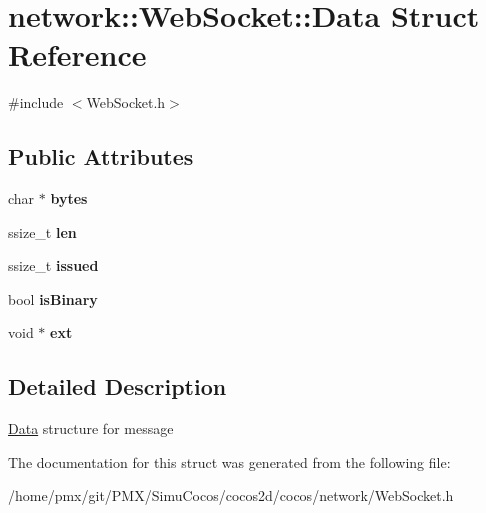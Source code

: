 \hypertarget{structnetwork_1_1WebSocket_1_1Data}{}\section{network\+:\+:Web\+Socket\+:\+:Data Struct Reference}
\label{structnetwork_1_1WebSocket_1_1Data}


{\ttfamily \#include $<$Web\+Socket.\+h$>$}

\subsection*{Public Attributes}
\begin{DoxyCompactItemize}
\item 
\mbox{\label{structnetwork_1_1WebSocket_1_1Data_af8961e019ff6d571ffb5baf07011db6d}} 
char $\ast$ {\bfseries bytes}
\item 
\mbox{\label{structnetwork_1_1WebSocket_1_1Data_a1215b287b0a3c15d0214e24abb21fb03}} 
ssize\+\_\+t {\bfseries len}
\item 
\mbox{\label{structnetwork_1_1WebSocket_1_1Data_a14a32388be0fc872bacf126a3f3e43dc}} 
ssize\+\_\+t {\bfseries issued}
\item 
\mbox{\label{structnetwork_1_1WebSocket_1_1Data_a1b65e741f92311a4a1f4cad3e8eb924b}} 
bool {\bfseries is\+Binary}
\item 
\mbox{\label{structnetwork_1_1WebSocket_1_1Data_ae78c9ac240f842811489862a0756395b}} 
void $\ast$ {\bfseries ext}
\end{DoxyCompactItemize}


\subsection{Detailed Description}
\hyperlink{structnetwork_1_1WebSocket_1_1Data}{Data} structure for message 

The documentation for this struct was generated from the following file\+:\begin{DoxyCompactItemize}
\item 
/home/pmx/git/\+P\+M\+X/\+Simu\+Cocos/cocos2d/cocos/network/Web\+Socket.\+h\end{DoxyCompactItemize}
